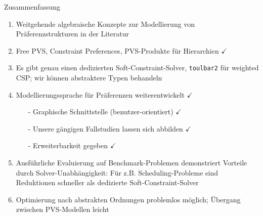 \begin{frame}{Zusammenfassung}

\begin{enumerate}
\item Weitgehende algebraische Konzepte zur Modellierung von Präferenzstrukturen in der Literatur
\item Free PVS, Constraint Preferences, PVS-Produkte für Hierarchien $\checkmark$ \pause 
\vspace*{1ex}
\item Es gibt genau einen dedizierten Soft-Constraint-Solver, \texttt{toulbar2} für weighted CSP; wir können abstraktere Typen behandeln
\vspace*{1ex} \pause 
\item Modellierungssprache für Präferenzen weiterentwickelt $\checkmark$
\begin{itemize}
\item[-] Graphische Schnittstelle (benutzer-orientiert) $\checkmark$
\item[-] Unsere gängigen Fallstudien lassen sich abbilden $\checkmark$
\item[-] Erweiterbarkeit gegeben $\checkmark$
\end{itemize}
\vspace*{1ex}
\pause 
\item Ausführliche Evaluierung auf \alert{Benchmark}-Problemen demonstriert Vorteile durch Solver-Unabhängigkeit: Für z.B. Scheduling-Probleme sind Reduktionen schneller als dedizierte Soft-Constraint-Solver
\item Optimierung nach abstrakten Ordnungen problemlos möglich; Übergang zwischen PVS-Modellen leicht
\end{enumerate}
\end{frame}

